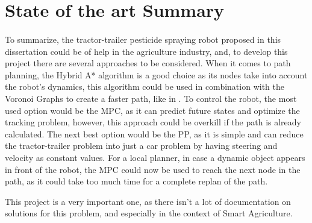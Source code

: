 \section{State of the art Summary}
\paragraph{}To summarize, the tractor-trailer pesticide spraying robot proposed in this dissertation 
could be of help in the agriculture industry, and, to develop this project there are several 
approaches to be considered. When it comes to path planning, the Hybrid A* algorithm is a 
good choice as its nodes take into account the robot's dynamics, this algorithm could be used 
in combination with the Voronoi Graphs to create a faster path, like in \cite{theman}. To 
control the robot, the most used option would be the \gls{MPC}, as it can predict 
future states and optimize the tracking problem, however, this approach could be overkill if the path 
is already calculated. The next best option would be the \gls{PP}, as it is simple and can reduce the tractor-trailer problem into 
just a car problem by having steering and velocity as constant values. For a local planner, in case 
a dynamic object appears in front of the robot, the \gls{MPC} could now be used to reach the next node in the path, 
as it could take too much time for a complete replan of the path. 

This project is a very important one, as there isn't a lot of documentation on solutions for this problem, and 
especially in the context of Smart Agriculture.
